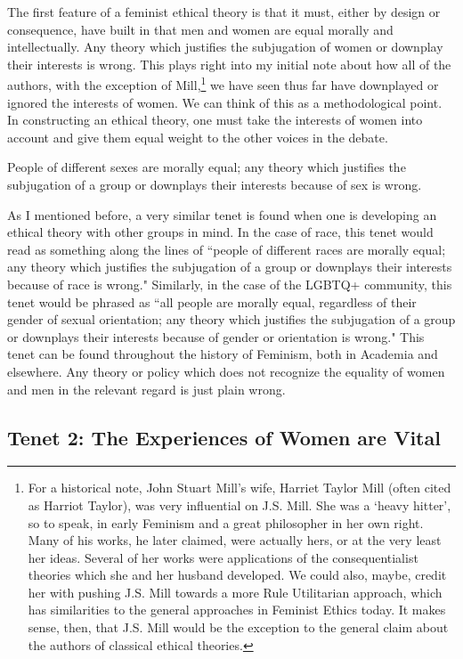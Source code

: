 The first feature of a feminist ethical theory is that it must, either by design or consequence, have built in that men and women are equal morally and intellectually. Any theory which justifies the subjugation of women or downplay their interests is wrong. This plays right into my initial note about how all of the authors, with the exception of Mill,\footnote{For a historical note, John Stuart Mill's wife, Harriet Taylor Mill (often cited as Harriot Taylor), was very influential on J.S. Mill. She was a `heavy hitter', so to speak, in early Feminism and a great philosopher in her own right. Many of his works, he later claimed, were actually hers, or at the very least her ideas. Several of her works were applications of the consequentialist theories which she and her husband developed. We could also, maybe, credit her with pushing J.S. Mill towards a more Rule Utilitarian approach, which has similarities to the general approaches in Feminist Ethics today. It makes sense, then, that J.S. Mill would be the exception to the general claim about the authors of classical ethical theories.} we have seen thus far have downplayed or ignored the interests of women. We can think of this as a methodological point. In constructing an ethical theory, one must take the interests of women into account and give them equal weight to the other voices in the debate.
\begin{center}
People of different sexes are morally equal; any theory which justifies the subjugation of a group or downplays their interests because of sex is wrong.
\end{center}
As I mentioned before, a very similar tenet is found when one is developing an ethical theory with other groups in mind. In the case of race, this tenet would read as something along the lines of ``people of different races are morally equal; any theory which justifies the subjugation of a group or downplays their interests because of race is wrong." Similarly, in the case of the LGBTQ+ community, this tenet would be phrased as ``all people are morally equal, regardless of their gender of sexual orientation; any theory which justifies the subjugation of a group or downplays their interests because of gender or orientation is wrong." This tenet can be found throughout the history of Feminism, both in Academia and elsewhere. Any theory or policy which does not recognize the equality of women and men in the relevant regard is just plain wrong. 

\subsection{Tenet 2: The Experiences of Women are Vital}

